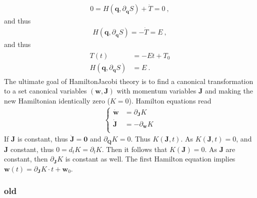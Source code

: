 \documentclass[letterpaper,10pt,english]{jupyterBook}
\begin{document}
\begin{equation*}
\begin{split}0 = H \left( \mathbf{q}, \partial_{\mathbf{q}} S \right) + \dot{T} = 0 \ ,\end{split}
\end{equation*}
\sphinxAtStartPar
and thus
\begin{equation*}
\begin{split}H \left( \mathbf{q}, \partial_{\mathbf{q}} S \right) = - \dot{T} = E \ ,\end{split}
\end{equation*}
\sphinxAtStartPar
and thus
\begin{equation*}
\begin{split}\begin{aligned}
  T(t) & = - E t + T_0 \\
  H \left( \mathbf{q}, \partial_{\mathbf{q}} S \right) & = E \ .
\end{aligned}\end{split}
\end{equation*}
\sphinxAtStartPar
The ultimate goal of Hamilton\sphinxhyphen{}Jacobi theory is to find a canonical transformation to a set canonical variables \((\mathbf{w}, \mathbf{J})\) with  momentum variables \(\mathbf{J}\) and making the new Hamiltonian identically zero (\(K = 0\)). Hamilton equations read
\begin{equation*}
\begin{split}\left\{\begin{aligned}
  \dot{\mathbf{w}} & = \partial_{\mathbf{J}} K \\
  \dot{\mathbf{J}} & =-\partial_{\mathbf{w}} K \\
\end{aligned}\right.\end{split}
\end{equation*}
\sphinxAtStartPar
If \(\mathbf{J}\) is constant, thus \(\dot{\mathbf{J}} = \mathbf{0}\) and \(\partial_{\mathbf{Q}} K = 0\). Thus \(K(\mathbf{J}, t)\). As \(K(\mathbf{J}, t) = 0\), and \(\mathbf{J}\) constant, thus \(0 = d_t K = \partial_t K\). Then it follows that \(K(\mathbf{J}) = 0\). As \(\mathbf{J}\) are constant, then \(\partial_{\mathbf{J}} K\) is constant as well. The first Hamilton equation implies \(\mathbf{w}(t) = \partial_{\mathbf{J}} K \cdot t + \mathbf{w}_0\).
\subsubsection*{old}
\end{document}
